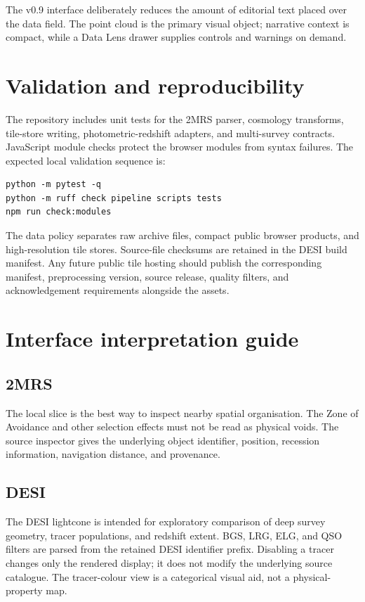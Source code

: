 \documentclass[11pt,a4paper]{article}
\begin{document}
The v0.9 interface deliberately reduces the amount of editorial text placed over the data field. The point cloud is the primary visual object; narrative context is compact, while a Data Lens drawer supplies controls and warnings on demand.

\section{Validation and reproducibility}

The repository includes unit tests for the 2MRS parser, cosmology transforms, tile-store writing, photometric-redshift adapters, and multi-survey contracts. JavaScript module checks protect the browser modules from syntax failures. The expected local validation sequence is:

\begin{verbatim}
python -m pytest -q
python -m ruff check pipeline scripts tests
npm run check:modules
\end{verbatim}

The data policy separates raw archive files, compact public browser products, and high-resolution tile stores. Source-file checksums are retained in the DESI build manifest. Any future public tile hosting should publish the corresponding manifest, preprocessing version, source release, quality filters, and acknowledgement requirements alongside the assets.

\section{Interface interpretation guide}

\subsection{2MRS}

The local slice is the best way to inspect nearby spatial organisation. The Zone of Avoidance and other selection effects must not be read as physical voids. The source inspector gives the underlying object identifier, position, recession information, navigation distance, and provenance.

\subsection{DESI}

The DESI lightcone is intended for exploratory comparison of deep survey geometry, tracer populations, and redshift extent. BGS, LRG, ELG, and QSO filters are parsed from the retained DESI identifier prefix. Disabling a tracer changes only the rendered display; it does not modify the underlying source catalogue. The tracer-colour view is a categorical visual aid, not a physical-property map.
\end{document}
